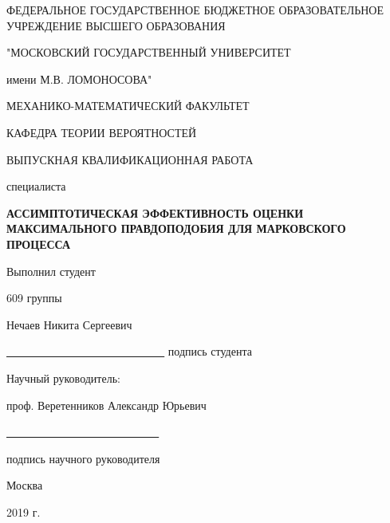 \begin{titlepage}

\begin{center}
ФЕДЕРАЛЬНОЕ ГОСУДАРСТВЕННОЕ БЮДЖЕТНОЕ ОБРАЗОВАТЕЛЬНОЕ УЧРЕЖДЕНИЕ ВЫСШЕГО ОБРАЗОВАНИЯ 

"МОСКОВСКИЙ ГОСУДАРСТВЕННЫЙ УНИВЕРСИТЕТ 

имени М.В. ЛОМОНОСОВА"

\vspace{0.5cm}

МЕХАНИКО-МАТЕМАТИЧЕСКИЙ ФАКУЛЬТЕТ

\vspace{0.5cm}

КАФЕДРА ТЕОРИИ ВЕРОЯТНОСТЕЙ

\vspace{3.0cm}

ВЫПУСКНАЯ КВАЛИФИКАЦИОННАЯ РАБОТА

\large{специалиста}

\vspace{1.7cm}

\textbf{АССИМПТОТИЧЕСКАЯ ЭФФЕКТИВНОСТЬ ОЦЕНКИ МАКСИМАЛЬНОГО ПРАВДОПОДОБИЯ ДЛЯ МАРКОВСКОГО ПРОЦЕССА}

\end{center}

\vspace{1.5cm}


\hfill
\minipage[r]{8cm}
Выполнил студент

609 группы

Нечаев Никита Сергеевич

\vspace{0.7cm}
\underline{\, \, \, \, \, \, \, \, \, \, \, \, \, \, \, \, \, \, \, \, \, \, \, \, \, \, \, \, \,}
\newline
подпись студента

\vspace{1cm}
Научный руководитель:

проф. Веретенников Александр Юрьевич

\vspace{0.7cm}
\underline{\, \, \, \, \, \, \, \, \, \, \, \, \, \, \, \, \, \, \, \, \, \, \, \, \, \, \, \,}

подпись научного руководителя

\endminipage

\vspace{\baselineskip}
\vspace{\baselineskip}
\vspace{\baselineskip}
\vspace{\baselineskip}
\vspace{\baselineskip}
\vspace{\baselineskip}
\vspace{\baselineskip}

\begin{center}

Москва

\vspace{0.5cm}
2019 г.
\end{center}


\end{titlepage}